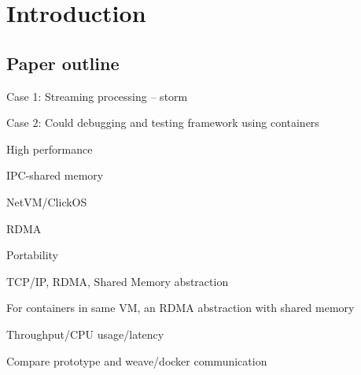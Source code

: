 \section{Introduction} \label{sec:introduction}

\subsection{Paper outline}



Case 1: Streaming processing – storm

Case 2: Could debugging and testing framework using containers


High performance

IPC-shared memory

NetVM/ClickOS

RDMA 

Portability

TCP/IP, RDMA, Shared Memory abstraction


For containers in same VM, an RDMA abstraction with shared memory


Throughput/CPU usage/latency

Compare prototype and weave/docker communication 
